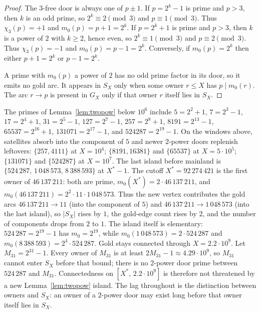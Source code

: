 \documentclass[11pt,a4paper]{article}
\begin{document}
\begin{proof}
The 3-free door is always one of \(p\pm 1\).
If \(p=2^k-1\) is prime and \(p>3\), then \(k\) is an odd prime, so \(2^k\equiv 2\pmod{3}\) and \(p\equiv 1\pmod{3}\).
Thus \(\chi_3(p)=+1\) and \(m_0(p)=p+1=2^k\).
If \(p=2^k+1\) is prime and \(p>3\), then \(k\) is a power of \(2\) with \(k\ge 2\), hence even, so \(2^k\equiv 1\pmod{3}\) and \(p\equiv 2\pmod{3}\).
Thus \(\chi_3(p)=-1\) and \(m_0(p)=p-1=2^k\).
Conversely, if \(m_0(p)=2^k\) then either \(p+1=2^k\) or \(p-1=2^k\).

A prime with \(m_0(p)\) a power of \(2\) has no odd prime factor in its door, so it emits no gold arc.
It appears in \(S_X\) only when some owner \(r\le X\) has \(p\mid m_0(r)\).
The arc \(r\to p\) is present in \(G_X\) only if that owner \(r\) itself lies in \(S_X\).
\end{proof}

The primes of Lemma~\ref{lem:twopow} below \(10^6\) include
\(5=2^2+1\),
\(7=2^3-1\),
\(17=2^4+1\),
\(31=2^5-1\),
\(127=2^7-1\),
\(257=2^8+1\),
\(8191=2^{13}-1\),
\(65537=2^{16}+1\),
\(131071=2^{17}-1\),
and
\(524287=2^{19}-1\).
On the windows above, satellites absorb into the component of \(5\) and newer \(2\)-power doors replenish leftovers: \(\{257,4111\}\) at \(X=10^4\); \(\{8191,16381\}\) and \(\{65537\}\) at \(X=5\cdot 10^5\); \(\{131071\}\) and \(\{524287\}\) at \(X=10^7\).
The last island before mainland is \(\{524\,287,\,1\,048\,573,\,8\,388\,593\}\) at \(X^*-1\).
The cutoff \(X^*=92\,274\,421\) is the first owner of \(46\,137\,211\): both are prime,
\(m_0(X^*)=2\cdot 46\,137\,211\), and \(m_0(46\,137\,211)=2^2\cdot 11\cdot 1\,048\,573\).
Thus the new vertex contributes the gold arcs \(46\,137\,211\to 11\) (into the component of \(5\)) and \(46\,137\,211\to 1\,048\,573\) (into the last island), so \(|S_X|\) rises by \(1\), the gold-edge count rises by \(2\), and the number of components drops from \(2\) to \(1\).
The island itself is elementary: \(524\,287=2^{19}-1\) has \(m_0=2^{19}\), while \(m_0(1\,048\,573)=2\cdot 524\,287\) and \(m_0(8\,388\,593)=2^4\cdot 524\,287\).
Gold stays connected through \(X=2.2\cdot 10^9\).
Let \(M_{31}=2^{31}-1\). Every owner of \(M_{31}\) is at least \(2M_{31}-1\approx 4.29\cdot 10^9\), so \(M_{31}\) cannot enter \(S_X\) before that bound; there is no \(2\)-power door prime between \(524\,287\) and \(M_{31}\).
Connectedness on \([X^*,\,2.2\cdot 10^9]\) is therefore not threatened by a new Lemma~\ref{lem:twopow} island.
The lag throughout is the distinction between owners and \(S_X\): an owner of a \(2\)-power door may exist long before that owner itself lies in \(S_X\).
\end{document}
